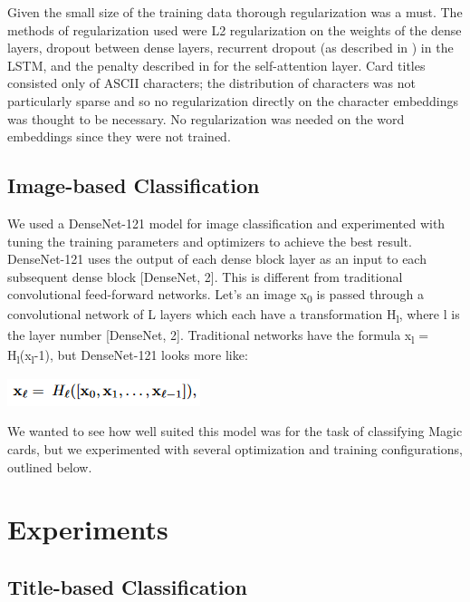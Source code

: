 \documentclass[letterpaper]{article} %
\begin{document}
Given the small size of the training data thorough regularization was a must.
The methods of regularization used were
L2 regularization on the weights of the dense layers,
dropout between dense layers,
recurrent dropout (as described in \cite{Gal2016ATG}) in the LSTM,
and the penalty described in \cite{Lin2017ASS} for the self-attention layer.
Card titles consisted only of ASCII characters;
the distribution of characters was not particularly sparse
and so no regularization directly on the character embeddings
was thought to be necessary.
No regularization was needed on the word embeddings since they were not trained.

\subsection{Image-based Classification}

We used a DenseNet-121 model for image classification and experimented with
tuning the training parameters and optimizers to achieve the best result.
DenseNet-121 uses the output of each dense block layer as an input to each
subsequent dense block [DenseNet, 2]. This is different from traditional
convolutional feed-forward networks. Let’s an image x\textsubscript{0} is passed through a
convolutional network of L layers which each have a transformation H\textsubscript{l}, where l
is the layer number [DenseNet, 2]. Traditional networks have the formula
x\textsubscript{l} = H\textsubscript{l}(x\textsubscript{l}-1), but DenseNet-121 looks more like:

\begin{center}
  \includegraphics[width=.3\textwidth]{densenet-formula}
\end{center}

We wanted to see how well suited this model was for the task of classifying Magic cards,
but we experimented with several optimization and training configurations,
outlined below.

\section{Experiments}


\subsection{Title-based Classification}
\end{document}
